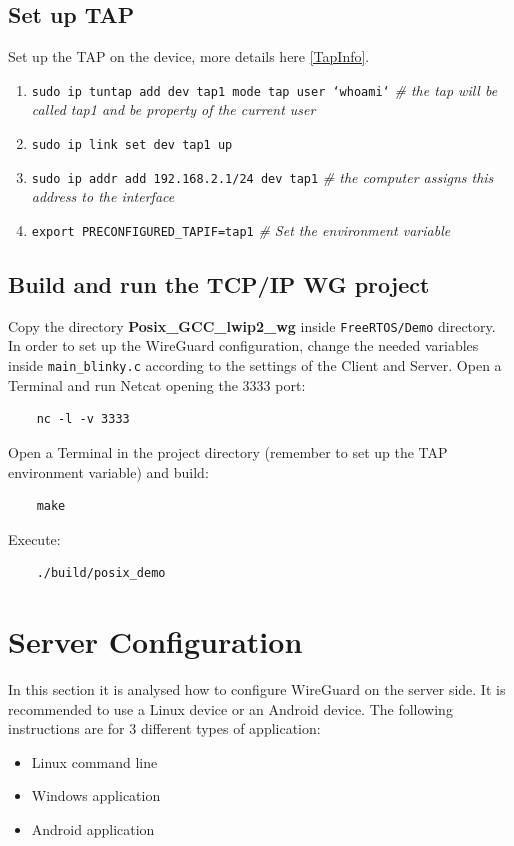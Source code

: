 \subsection{Set up TAP}
Set up the TAP on the device, more details here \ref{TapInfo}.
\begin{enumerate}
    \item \texttt{sudo ip tuntap add dev tap1 mode tap user `whoami`} \textit{\# the tap will be called tap1 and be property of the current user}
    \item \texttt{sudo ip link set dev tap1 up}
    \item \texttt{sudo ip addr add 192.168.2.1/24 dev tap1} \textit{\# the computer assigns this address to the interface}
    \item \texttt{export PRECONFIGURED\_TAPIF=tap1} \textit{\# Set the environment variable}
\end{enumerate}

\subsection{Build and run the TCP/IP WG project}
Copy the directory \textbf{Posix\_GCC\_lwip2\_wg} inside \texttt{FreeRTOS/Demo} directory.
In order to set up the WireGuard configuration, change the needed variables inside \texttt{main\_blinky.c} according to the settings of the Client and Server.
Open a Terminal and run Netcat\cite{Netcat} opening the 3333 port:
\begin{lstlisting}
    nc -l -v 3333
\end{lstlisting}

Open a Terminal in the project directory (remember to set up the TAP environment variable) and build:

\begin{lstlisting}
    make
\end{lstlisting}

Execute:
\begin{lstlisting}
    ./build/posix_demo
\end{lstlisting}

\section{Server Configuration}\label{sec:server}
In this section it is analysed how to configure WireGuard on the server side. It is recommended to use a Linux device or an Android device. 
The following instructions are for 3 different types of application:
\begin{itemize}
    \item Linux command line
    \item Windows application
    \item Android application
\end{itemize}

